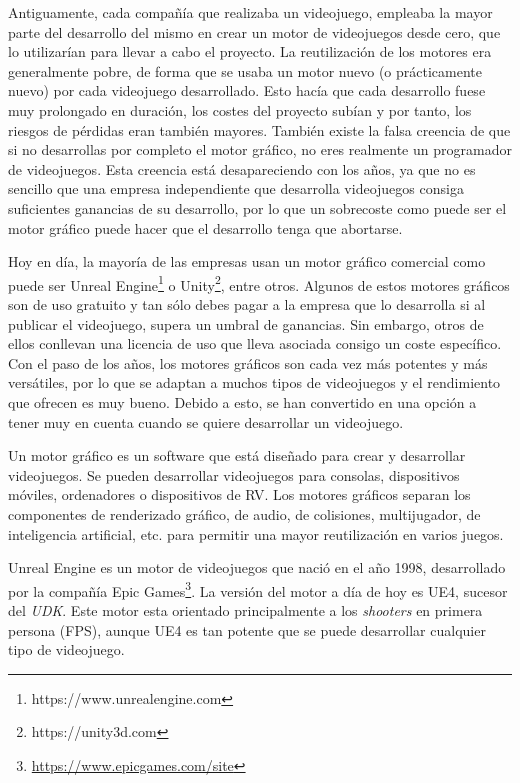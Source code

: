 Antiguamente, cada compañía que realizaba un videojuego, empleaba la mayor parte del desarrollo del mismo en crear un motor de videojuegos desde cero, que lo utilizarían para llevar a cabo el proyecto. La reutilización de los motores era generalmente pobre, de forma que se usaba un motor nuevo (o prácticamente nuevo) por cada videojuego desarrollado. Esto hacía que cada desarrollo fuese muy prolongado en duración, los costes del proyecto subían y por tanto, los riesgos de pérdidas eran también mayores. También existe la falsa creencia de que si no desarrollas por completo el motor gráfico, no eres realmente un programador de videojuegos. Esta creencia está desapareciendo con los años, ya que no es sencillo que una empresa independiente que desarrolla videojuegos consiga suficientes ganancias de su desarrollo, por lo que un sobrecoste como puede ser el motor gráfico puede hacer que el desarrollo tenga que abortarse.

\pagestyle{notsection}

Hoy en día, la mayoría de las empresas usan un motor gráfico comercial como puede ser Unreal Engine\footnote{https://www.unrealengine.com} o Unity\footnote{https://unity3d.com}, entre otros. Algunos de estos motores gráficos son de uso gratuito y tan sólo debes pagar a la empresa que lo desarrolla si al publicar el videojuego, supera un umbral de ganancias. Sin embargo, otros de ellos conllevan una licencia de uso que lleva asociada consigo un coste específico. Con el paso de los años, los motores gráficos son cada vez más potentes y más versátiles, por lo que se adaptan a muchos tipos de videojuegos y el rendimiento que ofrecen es muy bueno. Debido a esto, se han convertido en una opción a tener muy en cuenta cuando se quiere desarrollar un videojuego. 

Un motor gráfico \cite{5} es un software que está diseñado para crear y desarrollar videojuegos. Se pueden desarrollar videojuegos para consolas, dispositivos móviles, ordenadores o dispositivos de \acf{RV}. Los motores gráficos separan los componentes de renderizado gráfico, de audio, de colisiones, multijugador, de inteligencia artificial, etc. para permitir una mayor reutilización en varios juegos.

Unreal Engine es un motor de videojuegos que nació en el año 1998, desarrollado por la compañía Epic Games\footnote{\url{https://www.epicgames.com/site}}. La versión del motor a día de hoy es \acf{UE4}, sucesor del \textit{\acf{UDK}}. Este motor esta orientado principalmente a los \textit{shooters} en primera persona (\acf{FPS}), aunque \acs{UE4} es tan potente que se puede desarrollar cualquier tipo de videojuego.

